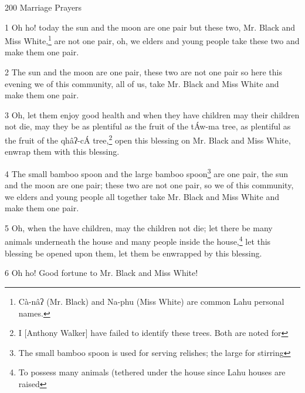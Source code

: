 
200 Marriage Prayers

1 Oh ho! today the sun and the moon are one pair but these two, Mr. Black and Miss
White,\footnote{Cà-nâʔ (Mr. Black) and Na-phu (Miss White) are common Lahu personal names.} are not one pair, oh, we elders and young people take these two and make
them one pair.

2 The sun and the moon are one pair, these two are not one pair so here this evening
we of this community, all of us, take Mr. Black and Miss White and make them one
pair.

3 Oh, let them enjoy good health and when they have children may their children
not die, may they be as plentiful as the fruit of the tÁw-ma tree, as plentiful
as the fruit of the qhâʔ-cÁ tree,\footnote{I [Anthony Walker] have failed to identify these trees. Both are noted for} open this blessing on Mr. Black and Miss
White, enwrap them with this blessing.

4 The small bamboo spoon and the large bamboo spoon\footnote{The small bamboo spoon is used for serving relishes; the large for stirring} are one pair, the sun and
the moon are one pair; these two are not one pair, so we of this community, we
elders and young people all together take Mr. Black and Miss White and make them
one pair.

5 Oh, when the have children, may the children not die; let there be many animals
underneath the house and many people inside the house,\footnote{To possess many animals (tethered under the house since Lahu houses are raised} let this blessing be
opened upon them, let them be enwrapped by this blessing.

6 Oh ho! Good fortune to Mr. Black and Miss White!

